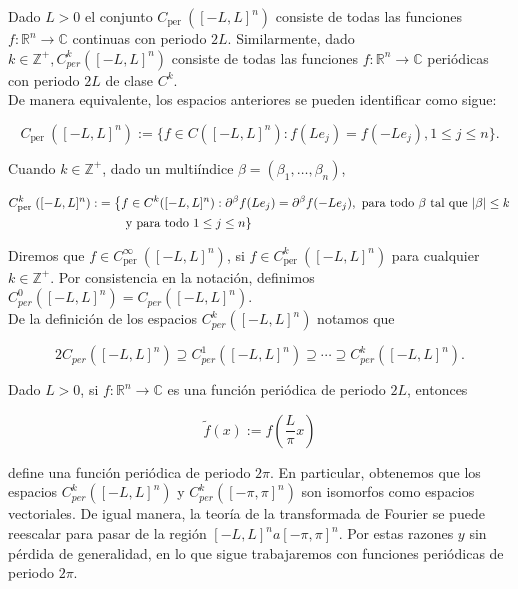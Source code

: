 \documentclass[12pt]{article}
\begin{document}
\begin{note}
    Dado $L>0$ el conjunto $C_{\text {per }}([-L, L]^n)$ consiste de todas las funciones $f: \mathbb{R}^n \rightarrow \mathbb{C}$ continuas con periodo $2L$. Similarmente, dado $k \in \mathbb{Z}^{+}, C_{p e r}^k([-L, L]^n)$ consiste de todas las funciones $f: \mathbb{R}^n \rightarrow \mathbb{C}$ periódicas con periodo $2 L$ de clase $C^k$.\\

De manera equivalente, los espacios anteriores se pueden identificar como sigue:

$$
C_{\text {per }}([-L, L]^n):=\{f \in C([-L, L]^n): f(Le_j)=f(-Le_j), 1\leq j\leq n\}.
$$


Cuando $k \in \mathbb{Z}^{+}$, dado un multiíndice $\beta=(\beta_1,\ldots,\beta_n)$,

\begin{align*}
    C_{\text {per }}^k([-L, L]^n):&=\left\{f \in C^k([-L, L]^n): \partial^{\beta}f(Le_j)=\partial^{\beta}f(-Le_j), \text{ para todo } \beta \text{ tal que } |\beta|\leq k\right. \\
    &\hspace{0.8cm} \text{y para todo } 1\leq j\leq n\}
\end{align*}

Diremos que $f \in C_{\text {per }}^{\infty}([-L, L]^n)$, si $f \in C_{\text {per }}^k([-L, L]^n)$ para cualquier $k \in \mathbb{Z}^{+}$. Por consistencia en la notación, definimos $C_{p e r}^0([-L, L]^n)=C_{p e r}([-L, L]^n)$.\\

De la definición de los espacios $C_{p e r}^k([-L, L]^n)$ notamos que

$$2
C_{p e r}([-L, L]^n) \supseteq C_{p e r}^1([-L, L]^n) \supseteq \cdots \supseteq C_{p e r}^k([-L, L]^n).
$$

\end{note}

Dado $L>0$, si $f: \mathbb{R}^n \rightarrow \mathbb{C}$ es una función periódica de periodo $2 L$, entonces

$$
\widetilde{f}(x):=f\left(\frac{L}{\pi} x\right)
$$

define una función periódica de periodo $2 \pi$. En particular, obtenemos que los espacios $C_{p e r}^k([-L, L]^n)$ y $C_{p e r}^k([-\pi, \pi]^n)$ son isomorfos como espacios vectoriales. De igual manera, la teoría de la transformada de Fourier se puede reescalar para pasar de la región $[-L, L]^n a[-\pi, \pi]^n$. Por estas razones $y$ sin pérdida de generalidad, en lo que sigue trabajaremos con funciones periódicas de periodo $2 \pi$.\\
\end{document}
